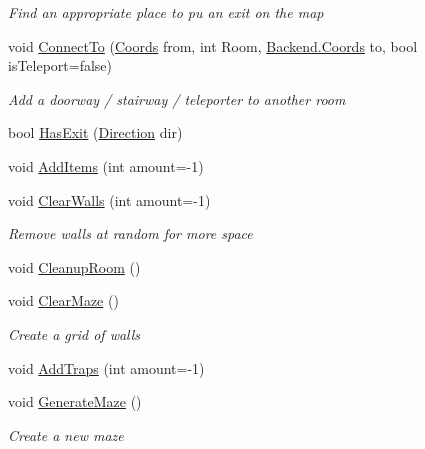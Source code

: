 \begin{DoxyCompactItemize}
\begin{DoxyCompactList}\small\item\em Find an appropriate place to pu an exit on the map \end{DoxyCompactList}\item 
void \hyperlink{class_gruppe22_1_1_backend_1_1_generator_a7e557a786bf0c8f614e2bed0e8ce0b03}{Connect\-To} (\hyperlink{class_gruppe22_1_1_backend_1_1_coords}{Coords} from, int Room, \hyperlink{class_gruppe22_1_1_backend_1_1_coords}{Backend.\-Coords} to, bool is\-Teleport=false)
\begin{DoxyCompactList}\small\item\em Add a doorway / stairway / teleporter to another room \end{DoxyCompactList}\item 
bool \hyperlink{class_gruppe22_1_1_backend_1_1_generator_ad3051d8d64ac5daec66d91421bb6e8f7}{Has\-Exit} (\hyperlink{namespace_gruppe22_1_1_backend_a2d53d5d14b8ea0951ba6971e5da1ebf5}{Direction} dir)
\item 
void \hyperlink{class_gruppe22_1_1_backend_1_1_generator_af49f7aaeb8fb4933504e3ebcb08bd256}{Add\-Items} (int amount=-\/1)
\item 
void \hyperlink{class_gruppe22_1_1_backend_1_1_generator_a95e36a3fb9b9deb35eafa57dd59edfde}{Clear\-Walls} (int amount=-\/1)
\begin{DoxyCompactList}\small\item\em Remove walls at random for more space \end{DoxyCompactList}\item 
void \hyperlink{class_gruppe22_1_1_backend_1_1_generator_a838990f7ecc479132b02a77b1e860565}{Cleanup\-Room} ()
\item 
void \hyperlink{class_gruppe22_1_1_backend_1_1_generator_ad27fdd309bf3c11574ed191363ac5bc9}{Clear\-Maze} ()
\begin{DoxyCompactList}\small\item\em Create a grid of walls \end{DoxyCompactList}\item 
void \hyperlink{class_gruppe22_1_1_backend_1_1_generator_a589a71fc90afb530b6bd960878910643}{Add\-Traps} (int amount=-\/1)
\item 
void \hyperlink{class_gruppe22_1_1_backend_1_1_generator_ab4241a0099707a0d99ca475ac4d11b40}{Generate\-Maze} ()
\begin{DoxyCompactList}\small\item\em Create a new maze \end{DoxyCompactList}\item 

\end{DoxyCompactItemize}
